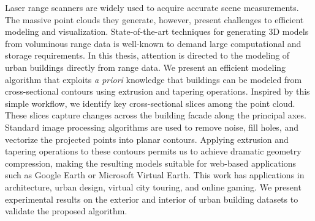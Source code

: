 Laser range scanners are widely used to acquire accurate scene measurements.
The massive point clouds they generate, however, present challenges to
efficient modeling and visualization.
State-of-the-art techniques for generating 3D models from voluminous
range data is well-known to demand large computational and storage requirements.
In this thesis, attention is directed to the modeling of urban buildings
directly from range data.
We present an efficient modeling algorithm that exploits \emph{a priori}
knowledge that buildings can be modeled from cross-sectional contours
using extrusion and tapering operations.
Inspired by this simple workflow, we identify key cross-sectional slices among
the point cloud.
These slices capture changes across the building facade along the principal axes.
Standard image processing algorithms are used to remove noise, fill holes,
and vectorize the projected points into planar contours.
Applying extrusion and tapering operations to these contours
permits us to achieve dramatic geometry compression, making the resulting
models suitable for web-based applications such as Google Earth
or Microsoft Virtual Earth.
This work has applications in architecture, urban design, virtual city
touring, and online gaming.
We present experimental results on the exterior and interior of urban building
datasets to validate the proposed algorithm.

